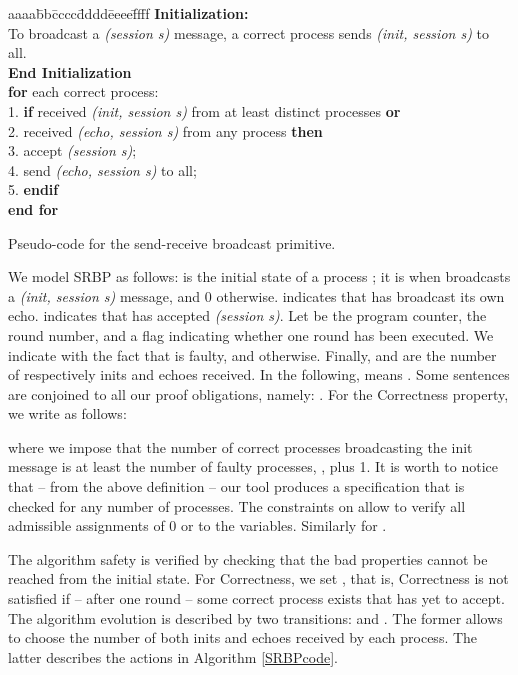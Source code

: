 \documentclass[11pt,a4paper]{article}
\begin{document}
{\begin{algorithm}[t]
\begin{footnotesize}
\begin{tabbing}
aaaa\=bb\=cccc\=dddd\=eeee\=ffff   \kill
{\bf Initialization:}  \\
\> To broadcast a \textit{(session s)} message, a correct process sends \textit{(init, session s)} to all.  \\
{\bf{End Initialization}}  \\
{\bf for} each correct process:  \\
1.\> \textbf{if} received \textit{(init, session s)} from at least  distinct processes \textbf{or}  \\
2.\> \> received  \textit{(echo, session s)} from any process \textbf{then}  \\
3.\> \> \> accept  \textit{(session s)};  \\
4.\> \> \> send  \textit{(echo, session s)} to all;  \\
5.\> \textbf{endif}  \\
{\bf end for}
\end{tabbing}
\end{footnotesize}
\caption{\label{SRBPcode}Pseudo-code for the send-receive broadcast primitive.}
\end{algorithm}


We model SRBP as follows:  is the initial state of a process ; it is  when  broadcasts a \textit{(init, session s)} message, and 0 otherwise.   indicates that  has broadcast its own echo.  indicates that  has accepted \textit{(session s)}.  Let  be the program counter,  the round number, and  a flag indicating whether one round has been executed.  We indicate with  the fact that  is faulty, and  otherwise.  Finally,  and  are the number of respectively inits and echoes received.  
In the following,  means .  
Some sentences are conjoined to all our proof obligations, namely:
.
For the Correctness property, we write  as follows:
{\footnotesize

}
where we impose that the number of correct processes broadcasting the init message is at least the number of faulty processes, , plus 1.  It is worth to notice that -- from the above definition -- our tool produces a specification that is checked for any  number of processes.  The constraints on  allow to verify all admissible assignments of 0 or  to the variables.  Similarly for .

The algorithm safety is verified by checking that
the bad properties 
cannot be reached from the initial state.  For Correctness, we set
,
that is, Correctness is not satisfied if -- after one round -- some correct process exists that has yet to accept.
The algorithm evolution is described by two transitions:  and .  The former allows to choose the number of both inits and echoes received by each process.  The latter describes the actions in Algorithm \ref{SRBPcode}.

}
\end{document}

